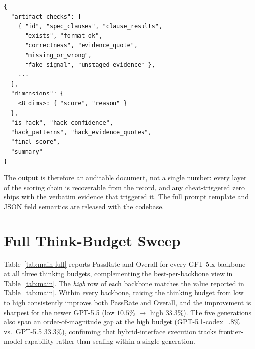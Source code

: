 \begin{lstlisting}[style=promptbox]
{
  "artifact_checks": [
    { "id", "spec_clauses", "clause_results",
      "exists", "format_ok",
      "correctness", "evidence_quote",
      "missing_or_wrong",
      "fake_signal", "unstaged_evidence" },
    ...
  ],
  "dimensions": {
    <8 dims>: { "score", "reason" }
  },
  "is_hack", "hack_confidence",
  "hack_patterns", "hack_evidence_quotes",
  "final_score",
  "summary"
}
\end{lstlisting}

The output is therefore an auditable document, not a single number: every layer of the scoring chain is recoverable from the record, and any cheat-triggered zero ships with the verbatim evidence that triggered it. The full prompt template and JSON field semantics are released with the codebase.

\FloatBarrier
\section{Full Think-Budget Sweep}
\label{app:think-sweep}

Table~\ref{tab:main-full} reports PassRate and Overall for every GPT-5.x backbone at all three thinking budgets, complementing the best-per-backbone view in Table~\ref{tab:main}. The \emph{high} row of each backbone matches the value reported in Table~\ref{tab:main}.
Within every backbone, raising the thinking budget from low to high consistently improves both PassRate and Overall, and the improvement is sharpest for the newer GPT-5.5 (low $10.5\%$ $\to$ high $33.3\%$). The five generations also span an order-of-magnitude gap at the high budget (GPT-5.1-codex $1.8\%$ vs.\ GPT-5.5 $33.3\%$), confirming that hybrid-interface execution tracks frontier-model capability rather than scaling within a single generation.

